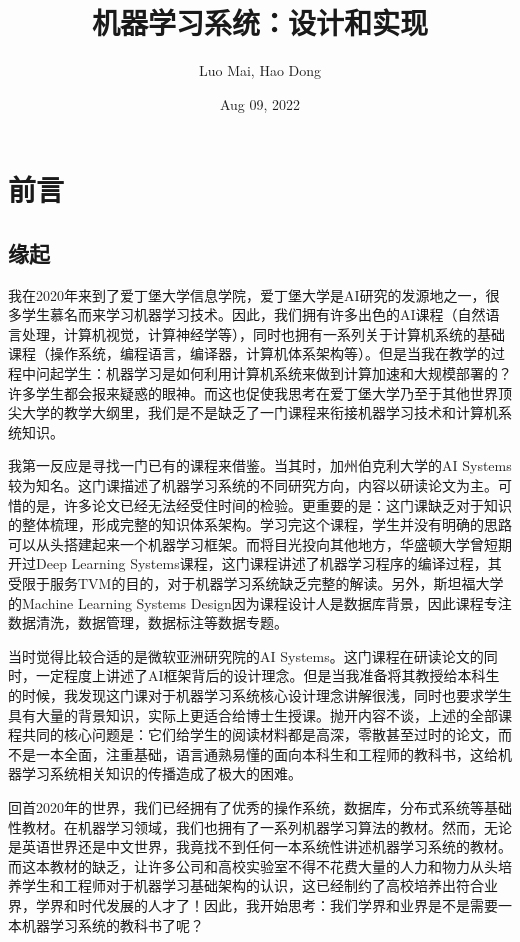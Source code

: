 \documentclass[letterpaper,10pt,english]{sphinxmanual}
\title{机器学习系统：设计和实现}
\date{Aug 09, 2022}
\author{Luo Mai, Hao Dong}
\begin{document}
\pagestyle{empty}
\sphinxmaketitle
\pagestyle{plain}
\sphinxtableofcontents
\pagestyle{normal}
\label{\detokenize{index::doc}}



\chapter{前言}
\label{\detokenize{chapter_preface/index:id1}}\label{\detokenize{chapter_preface/index::doc}}

\section{缘起}
\label{\detokenize{chapter_preface/index:id2}}
\sphinxAtStartPar
我在2020年来到了爱丁堡大学信息学院，爱丁堡大学是AI研究的发源地之一，很多学生慕名而来学习机器学习技术。因此，我们拥有许多出色的AI课程（自然语言处理，计算机视觉，计算神经学等），同时也拥有一系列关于计算机系统的基础课程（操作系统，编程语言，编译器，计算机体系架构等）。但是当我在教学的过程中问起学生：机器学习是如何利用计算机系统来做到计算加速和大规模部署的？许多学生都会报来疑惑的眼神。而这也促使我思考在爱丁堡大学乃至于其他世界顶尖大学的教学大纲里，我们是不是缺乏了一门课程来衔接机器学习技术和计算机系统知识。

\sphinxAtStartPar
我第一反应是寻找一门已有的课程来借鉴。当其时，加州伯克利大学的AI
Systems较为知名。这门课描述了机器学习系统的不同研究方向，内容以研读论文为主。可惜的是，许多论文已经无法经受住时间的检验。更重要的是：这门课缺乏对于知识的整体梳理，形成完整的知识体系架构。学习完这个课程，学生并没有明确的思路可以从头搭建起来一个机器学习框架。而将目光投向其他地方，华盛顿大学曾短期开过Deep
Learning
Systems课程，这门课程讲述了机器学习程序的编译过程，其受限于服务TVM的目的，对于机器学习系统缺乏完整的解读。另外，斯坦福大学的Machine
Learning Systems
Design因为课程设计人是数据库背景，因此课程专注数据清洗，数据管理，数据标注等数据专题。

\sphinxAtStartPar
当时觉得比较合适的是微软亚洲研究院的AI
Systems。这门课程在研读论文的同时，一定程度上讲述了AI框架背后的设计理念。但是当我准备将其教授给本科生的时候，我发现这门课对于机器学习系统核心设计理念讲解很浅，同时也要求学生具有大量的背景知识，实际上更适合给博士生授课。抛开内容不谈，上述的全部课程共同的核心问题是：它们给学生的阅读材料都是高深，零散甚至过时的论文，而不是一本全面，注重基础，语言通熟易懂的面向本科生和工程师的教科书，这给机器学习系统相关知识的传播造成了极大的困难。

\sphinxAtStartPar
回首2020年的世界，我们已经拥有了优秀的操作系统，数据库，分布式系统等基础性教材。在机器学习领域，我们也拥有了一系列机器学习算法的教材。然而，无论是英语世界还是中文世界，我竟找不到任何一本系统性讲述机器学习系统的教材。而这本教材的缺乏，让许多公司和高校实验室不得不花费大量的人力和物力从头培养学生和工程师对于机器学习基础架构的认识，这已经制约了高校培养出符合业界，学界和时代发展的人才了！因此，我开始思考：我们学界和业界是不是需要一本机器学习系统的教科书了呢？
\end{document}

